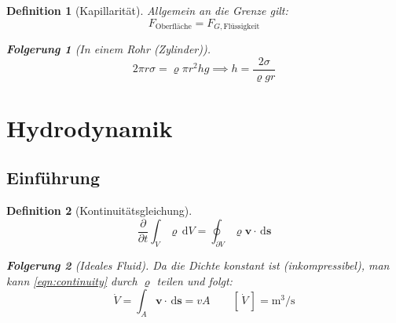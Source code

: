 \documentclass[a4paper, twocolumn]{article}
\numberwithin{equation}{section}
\theoremstyle{hsr-def}
\newtheorem{definition}{Definition}[section]
\theoremstyle{hsr-sub}
\newtheorem{result}{Folgerung}[definition]
\newtheorem{remark}{Bemerkung}[definition]
\newcommand{\dd}[1]{\ensuremath{\mathrm{d}#1}}
\newcommand{\di}[1]{\,\dd{#1}}
\newcommand{\pderiv}[2]{\ensuremath{\frac{\partial #1}{\partial #2}}}
\renewcommand{\vec}[1]{\ensuremath{\mathbf{#1}}}
\newcommand{\unitsof}[1]{\ensuremath{\left[\,#1\,\right]}}
\begin{document}
\begin{definition}[Kapillarit\"at]
Allgemein an die Grenze gilt:
\[
    F_\text{Oberfl\"ache} = F_{G,\text{Fl\"ussigkeit}}
\]
\begin{result}[In einem Rohr (Zylinder)]
\[
    2\pi r\sigma = \varrho\pi r^2 hg \implies  h = \frac{2\sigma}{\varrho g r}
\]
\end{result}
\end{definition}

\section{Hydrodynamik}
\subsection{Einf\"uhrung}
\begin{definition}[Kontinuit\"atsgleichung]
\begin{equation} \label{eqn:continuity}
    \pderiv{}{t}\int_V \varrho \di{V} 
    = \oint_{\partial V} \varrho \vec{v}\cdot\di{\vec{s}}
\end{equation}

\begin{result}[Ideales Fluid]
Da die Dichte konstant ist (inkompressibel), man kann \eqref{eqn:continuity} durch \(\varrho\) teilen und folgt:
\[
    \dot{V} = \int_A \vec{v}\cdot\di{\vec{s}} = vA
    \qquad
    \unitsof{\dot{V}} = \si{\cubic\metre\per\second}
\]
\end{result}

\end{definition}
\end{document}
